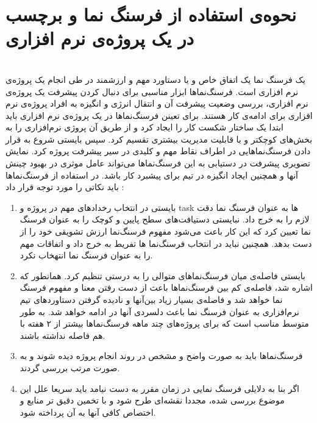 
\section{نحوه‌ی استفاده از فرسنگ نما و برچسب در یک پروژه‌ی نرم افزاری}\ \\

یک فرسنگ نما یک اتفاق خاص و یا دستاورد مهم و ارزشمند در طی انجام یک پروژه‌ی نرم افزاری است. فرسنگ‌نما‌ها ابزار‌ مناسبی برای دنبال کردن پیشرفت یک پروژه‌ی نرم افزاری، بررسی وضعیت پیشرفت آن و انتقال انرژی و انگیزه به افراد پروژه‌ی نرم افزاری برای ادامه‌ی کار هستند. برای تعینن فرسنگ‌نما‌ها در یک پروژه‌ی نرم افزاری باید ابتدا یک ساختار شکست کار
را ایجاد کرد و از طریق آن پروژی نرم‌افزاری را به بخش‌های کوچکتر و با قابلیت مدیریت بیشتری تقسیم کرد. سپس بایستی شروع به قرار دادن فرسنگ‌نما‌هایی در اطراف نقاط مهم و کلیدی در سیر پیشرفت پروژه کرد. نمایش تصویری پیشرفت در دستیابی به این فرسنگ‌نما‌ها می‌تواند عامل موثری در بهبود چینش‌ آنها و همچنین ایجاد انگیزه در تیم برای پیشبرد کار باشد.
 در استفاده از فرسنگ‌نما‌ها باید نکاتی را مورد توجه قرار داد :

\begin{enumerate}
\item 
بایستی در انتخاب رخداد‌های مهم در پروژه و task ها به عنوان فرسنگ نما دقت لازم را به خرج داد. نبایستی دستیافت‌های سطح پایین و کوچک را به عنوان فرسنگ نما تعیین کرد که این کار باعث می‌شود مفهوم فرسنگ‌نما ارزش تشویقی خود را از دست بدهد. همچنین نباید در انتخاب فرسنگ‌نما ها تفریط به خرج داد و اتفاقات مهم را به عنوان فرسنگ نما انتهخاب نکرد.
\item 
بایستی فاصله‌ی میان فرسنگ‌نما‌های متوالی را به درستی تنظیم کرد. همانطور که اشاره شد، فاصله‌ی کم بین فرسنگ‌نما‌ها باعث از دست رفتن معنا و مفهوم فرسنگ نما خواهد شد و فاصله‌ی بسیار زیاد بین‌آنها و نادیده گرفتن دستاورد‌های تیم نرم‌افزاری به عنوان فرسنگ نما باعث دلسردی آنها در ادامه خواهد شد. به طور متوسط مناسب است که برای پروژه‌های چند ماهه فرسنگ‌نما‌ها بیشتر از ۲ هفته با هم فاصله نداشته باشند.
\item
فرسنگ‌نما‌ها باید به صورت واضح و مشخص در روند انجام پروژه دیده شوند و به صورت مرتب بررسی گردند.
\item
اگر بنا به دلایلی فرسنگ نمایی در زمان مقرر به دست نیامد باید سریعا علل این موضوع بررسی شده، مجددا نقشه‌ای طرح شود و با تخمین دقیق تر منابع و اختصاص کافی آنها به آن پرداخته شود.

\end{enumerate}

